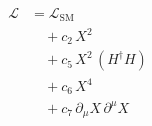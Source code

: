 \documentclass{article}
\begin{document}
\begin{align*}\mathcal{L} &= \mathcal{L}_{\mathrm{SM}}\\ &\quad + c_{2}\,{X}^{2}\\ &\quad + c_{5}\,{X}^{2}\,\left(H^{\dagger} H\right)\\ &\quad + c_{6}\,{X}^{4}\\ &\quad + c_{7}\,\partial_{\mu} X\,\partial^{\mu} X\end{align*}
\end{document}

